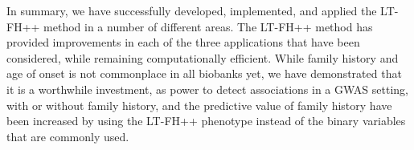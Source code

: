 In summary, we have successfully developed, implemented, and applied the LT-FH++ method in a number of different areas. The LT-FH++ method has provided improvements in each of the three applications that have been considered, while remaining computationally efficient. While family history and age of onset is not commonplace in all biobanks yet, we have demonstrated that it is a worthwhile investment, as power to detect associations in a GWAS setting, with or without family history, and the predictive value of family history have been increased by using the LT-FH++ phenotype instead of the binary variables that are commonly used.

